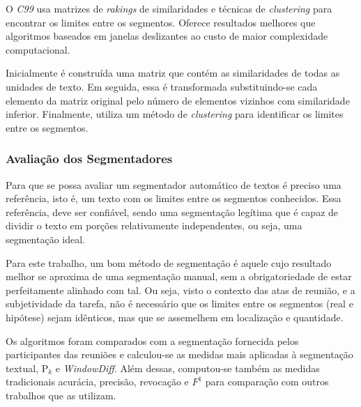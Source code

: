 O \textit{C99} usa matrizes de \textit{rakings} de similaridades e técnicas de \textit{clustering} para encontrar os limites entre os segmentos. Oferece resultados melhores que algoritmos baseados em janelas deslizantes ao custo de maior complexidade computacional.

Inicialmente é construída uma matriz que contém as similaridades de todas as unidades de texto. Em seguida, essa é transformada substituindo-se cada elemento da matriz original pelo número de elementos vizinhos com similaridade inferior.  Finalmente, utiliza um método de \textit{clustering} %
para identificar os limites entre os segmentos. 










\subsubsection{Avaliação dos Segmentadores}



Para que se possa avaliar um segmentador automático de textos é preciso uma referência, isto é, um texto com os limites entre os segmentos conhecidos. Essa referência, deve ser confiável, sendo uma segmentação legítima que é capaz de dividir o texto em porções relativamente independentes, ou seja, uma segmentação ideal.

Para este trabalho, um bom método de segmentação é aquele cujo resultado melhor se aproxima de uma segmentação manual, sem a obrigatoriedade de estar perfeitamente alinhado com tal. Ou seja, visto o contexto das atas de reunião, e a subjetividade da tarefa, não é necessário que os limites entre os segmentos (real e hipótese) sejam idênticos, mas que se assemelhem em localização e quantidade.

Os algoritmos foram comparados com a segmentação fornecida pelos participantes das reuniões e calculou-se as medidas mais aplicadas à segmentação textual, P$_k$ e \textit{WindowDiff}. Além dessas, computou-se também as medidas tradicionais acurácia, precisão, revocação e $F^1$ para comparação com outros trabalhos que as utilizam.

